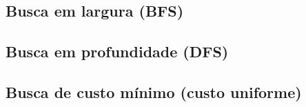 \documentclass[12pt,a4paper]{article}
\begin{document}

\subsection{Busca em largura (BFS)}
\label{sec:bfs}

\subsection{Busca em profundidade (DFS)}
\label{sec:dfs}

\subsection{Busca de custo mínimo (custo uniforme)}
\label{sec:lcfs}
\end{document}

